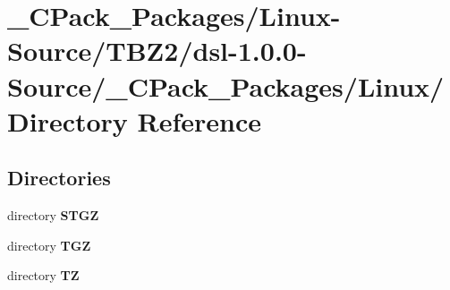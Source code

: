 \section{\_\-CPack\_\-Packages/Linux-\/Source/TBZ2/dsl-\/1.0.0-\/Source/\_\-CPack\_\-Packages/Linux/ Directory Reference}
\label{dir_148ae9827297a31a7cbc6d539c2cac20}
\subsection*{Directories}
\begin{DoxyCompactItemize}
\item 
directory {\bf STGZ}
\item 
directory {\bf TGZ}
\item 
directory {\bf TZ}
\end{DoxyCompactItemize}

